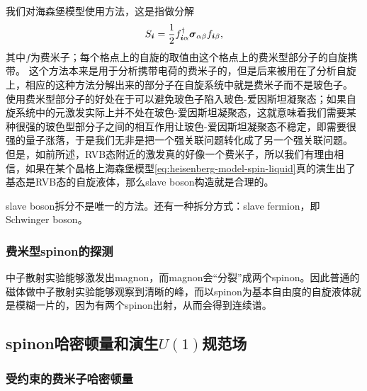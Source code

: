 我们对海森堡模型使用方法，这是指做分解
\begin{equation}
    {S}_{\vb*{i}} = \frac{1}{2} {f}_{\vb*{i} \alpha}^\dagger \vb*{\sigma}_{\alpha \beta} f_{\vb*{i} \beta},
\end{equation}
其中${f}$为费米子；每个格点上的自旋的取值由这个格点上的费米型部分子的自旋携带。
这个方法本来是用于分析携带电荷的费米子的，但是后来被用在了分析自旋上，相应的这种方法分解出来的部分子在自旋系统中就是费米子而不是玻色子。
使用费米型部分子的好处在于可以避免玻色子陷入玻色-爱因斯坦凝聚态；如果自旋系统中的元激发实际上并不处在玻色-爱因斯坦凝聚态，这就意味着我们需要某种很强的玻色型部分子之间的相互作用让玻色-爱因斯坦凝聚态不稳定，即需要很强的量子涨落，于是我们无非是把一个强关联问题转化成了另一个强关联问题。
但是，如前所述，RVB态附近的激发真的好像一个费米子，所以我们有理由相信，如果在某个晶格上海森堡模型\eqref{eq:heisenberg-model-spin-liquid}真的演生出了基态是RVB态的自旋液体，那么slave boson构造就是合理的。

slave boson拆分不是唯一的方法。还有一种拆分方式：slave fermion，即Schwinger boson。

\subsubsection{费米型spinon的探测}

中子散射实验能够激发出magnon，而magnon会“分裂”成两个spinon。因此普通的磁体做中子散射实验能够观察到清晰的峰，而以spinon为基本自由度的自旋液体就是模糊一片的，因为有两个spinon出射，从而会得到连续谱。

\subsection{spinon哈密顿量和演生$U(1)$规范场}

\subsubsection{受约束的费米子哈密顿量}

